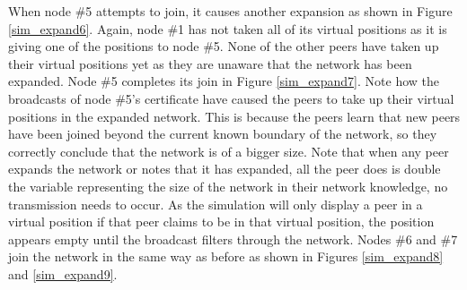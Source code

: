 \documentclass[ %
                    author={Luke Murray},
                supervisor={Dr. Simon Hollis},
                     title={Shadow Peer-to-Peer Networks},
                  subtitle={},
                    degree={MEng},
                      year={2013} ]{thesis}
\begin{document}
When node \#5 attempts to join, it causes another expansion as shown in Figure \ref{sim_expand6}. Again, node \#1 has not taken all of its virtual positions as it is giving one of the positions to node \#5. None of the other peers have taken up their virtual positions yet as they are unaware that the network has been expanded. Node \#5 completes its join in Figure \ref{sim_expand7}. Note how the broadcasts of node \#5's certificate have caused the peers to take up their virtual positions in the expanded network. This is because the peers learn that new peers have been joined beyond the current known boundary of the network, so they correctly conclude that the network is of a bigger size. Note that when any peer expands the network or notes that it has expanded, all the peer does is double the variable representing the size of the network in their network knowledge, no transmission needs to occur. As the simulation will only display a peer in a virtual position if that peer claims to be in that virtual position, the position appears empty until the broadcast filters through the network. Nodes \#6 and \#7 join the network in the same way as before as shown in Figures \ref{sim_expand8} and \ref{sim_expand9}.
\end{document}
